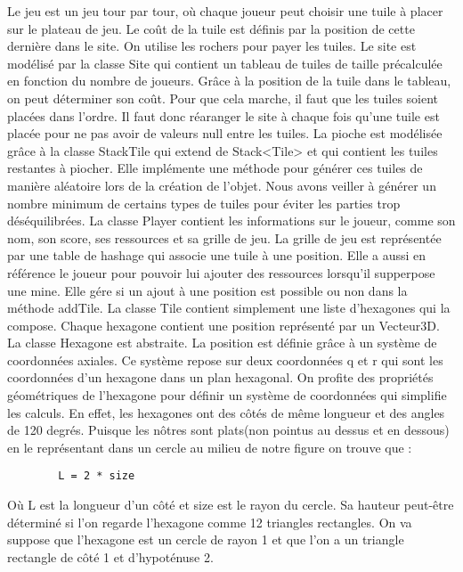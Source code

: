 \documentclass{article}
\begin{document}
    Le jeu est un jeu tour par tour, où chaque joueur peut choisir une tuile à placer sur le plateau de jeu.
    Le coût de la tuile est définis par la position de cette dernière dans le site.
    On utilise les rochers pour payer les tuiles.
    Le site est modélisé par la classe Site qui contient un tableau de tuiles de taille précalculée en fonction du nombre de joueurs.
    Grâce à la position de la tuile dans le tableau, on peut déterminer son coût. Pour que cela marche, il faut que les tuiles soient placées dans l'ordre.
    Il faut donc réaranger le site à chaque fois qu'une tuile est placée pour ne pas avoir de valeurs null entre les tuiles.
    La pioche est modélisée grâce à la classe StackTile qui extend de Stack\textless{}Tile\textgreater{} et qui contient les tuiles restantes à piocher.
    Elle implémente une méthode pour générer ces tuiles de manière aléatoire lors de la création de l'objet.
    Nous avons veiller à générer un nombre minimum de certains types de tuiles pour éviter les parties trop déséquilibrées.
    La classe Player contient les informations sur le joueur, comme son nom, son score, ses ressources et sa grille de jeu.
    La grille de jeu est représentée par une table de hashage qui associe une tuile à une position.
    Elle a aussi en référence le joueur pour pouvoir lui ajouter des ressources lorsqu'il supperpose une mine.
    Elle gére si un ajout à une position est possible ou non dans la méthode addTile.
    La classe Tile contient simplement une liste d'hexagones qui la compose.
    Chaque hexagone contient une position représenté par un Vecteur3D. La classe Hexagone est abstraite. 
    La position est définie grâce à un système de coordonnées axiales.
    Ce système repose sur deux coordonnées q et r qui sont les coordonnées d'un hexagone dans un plan hexagonal.
    On profite des propriétés géométriques de l'hexagone pour définir un système de coordonnées qui simplifie les calculs.
    En effet, les hexagones ont des côtés de même longueur et des angles de 120 degrés.
    Puisque les nôtres sont plats(non pointus au dessus et en dessous) en le représentant dans un cercle au milieu de notre figure on trouve que :
    \begin{verbatim}
        L = 2 * size
    \end{verbatim}
    Où L est la longueur d'un côté et size est le rayon du cercle.
    Sa hauteur peut-être déterminé si l'on regarde l'hexagone comme 12 triangles rectangles.
    On va suppose que l'hexagone est un cercle de rayon 1 et que l'on a un triangle rectangle de côté 1 et d'hypoténuse 2.
\end{document}
